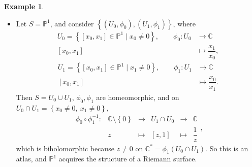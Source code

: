 \documentclass{article}
\newcommand{\C}{\mathbb{C}}
\renewcommand{\P}{\mathbb{P}}
\newcommand{\rb}[1]{\left( #1 \right)}
\renewcommand{\sb}[1]{\left[ #1 \right]}
\newcommand{\cb}[1]{\left\{ #1 \right\}}
\theoremstyle{definition}\newtheorem{definition}{Definition}[section]
\theoremstyle{definition}\newtheorem{notation}[definition]{Notation}
\theoremstyle{definition}\newtheorem{remark}[definition]{Remark}
\theoremstyle{definition}\newtheorem{example1}[definition]{Example}
\theoremstyle{definition}\newtheorem{fact}{Fact}
\theoremstyle{definition}\newtheorem{exercise}{Exercise}
\theoremstyle{definition}\newtheorem*{example2}{Example}
\begin{document}
\begin{example1}
\hfill
\begin{itemize}
\item Let $ S = \P^1 $, and consider $ \cb{\rb{U_0, \phi_0}, \rb{U_1, \phi_1}} $, where
\begin{align*}
U_0 = \cb{\sb{x_0, x_1} \in \P^1 \mid x_0 \ne 0}, \qquad \phi_0 : U_0 & \to \C \\
\sb{x_0, x_1} & \mapsto \dfrac{x_1}{x_0},
\end{align*}
\begin{align*}
U_1 = \cb{\sb{x_0, x_1} \in \P^1 \mid x_1 \ne 0}, \qquad \phi_1 : U_1 & \to \C \\
\sb{x_0, x_1} & \mapsto \dfrac{x_0}{x_1}.
\end{align*}
Then $ S = U_0 \cup U_1 $, $ \phi_0, \phi_1 $ are homeomorphic, and on $ U_0 \cap U_1 = \cb{x_0 \ne 0, \ x_1 \ne 0} $,
$$
\begin{array}{cccccc}
\phi_0 \circ \phi_1^{-1} : & \C \setminus \cb{0} & \to & U_1 \cap U_0 & \to & \C \\
& z & \mapsto & \sb{z, 1} & \mapsto & \dfrac{1}{z}
\end{array},
$$
which is biholomorphic because $ z \ne 0 $ on $ \C^* = \phi_1\rb{U_0 \cap U_1} $. So this is an atlas, and $ \P^1 $ acquires the structure of a Riemann surface.



\end{itemize}
\end{example1}
\end{document}
